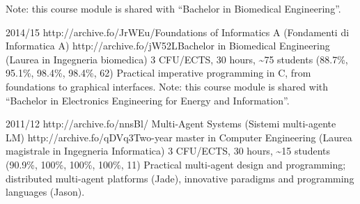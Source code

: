 \begin{outerlist}
{            Note: this course module is shared with ``Bachelor in Biomedical Engineering''.
        }
    \item[2014/15]
        \unibocourse
        {http://archive.fo/JrWEu/}{Foundations of Informatics A (Fondamenti di Informatica A)}
        {http://archive.fo/jW52L}{Bachelor in Biomedical Engineering (Laurea in Ingegneria biomedica)}
        {3 CFU/ECTS, 30 hours, \textasciitilde{}75 students}
        {(88.7\%, 95.1\%, 98.4\%, 98.4\%, 62)}
        {
            Practical imperative programming in C, from foundations to graphical interfaces.
            Note: this course module is shared with ``Bachelor in Electronics Engineering for Energy and Information''.
        }
    \item[2011/12]
        \unibocourse
        {http://archive.fo/nnsBl/}
        {Multi-Agent Systems (Sistemi multi-agente LM)}
        {http://archive.fo/qDVq3}{Two-year master in Computer Engineering (Laurea magistrale in Ingegneria Informatica)}
        {3 CFU/ECTS, 30 hours, \textasciitilde{}15 students}
        {(90.9\%, 100\%, 100\%, 100\%, 11)}
        {Practical multi-agent design and programming; distributed multi-agent platforms (Jade), innovative paradigms and programming languages (Jason).}
\end{outerlist}

